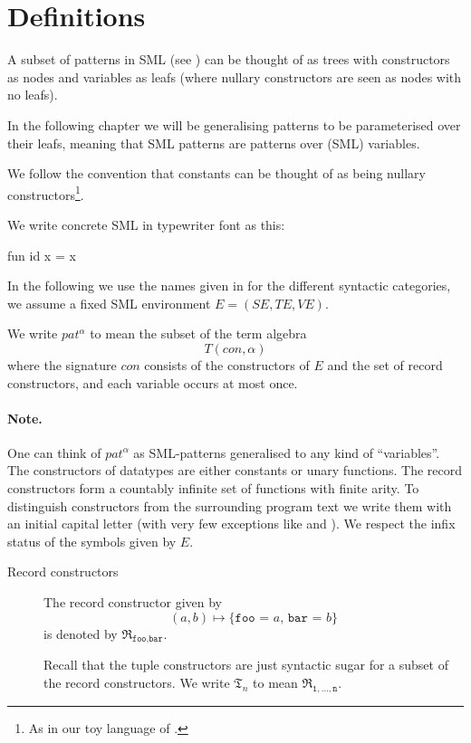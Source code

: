 \section{Definitions}\label{sec:definitions}
A subset of patterns in SML (see ) can be thought of as
trees with constructors as nodes and variables as leafs (where nullary
constructors are seen as nodes with no leafs).

In the following chapter we will be generalising patterns to be parameterised
over their leafs, meaning that SML patterns are patterns over (SML) variables.

We follow the convention that constants can be thought of as being nullary
constructors\footnote{As in our toy language of
  .}.

We write concrete SML in typewriter font as this:
\begin{sml}
fun id x = x
\end{sml}

In the following we use the names given in \cite{SML97} for the different
syntactic categories, we assume a fixed SML environment $E = (S\!E, T\!E,
V\!E)$.

\begin{definition}
  We write $pat^\alpha$ to mean the subset of the term algebra
  \[
  T(con, \alpha)
  \]
  where the signature $con$ consists of the constructors of $E$ and the set of
  record constructors, and each variable occurs at most once.
\end{definition}

\paragraph{Note.} One can think of $pat^\alpha$ as SML-patterns generalised to
any kind of ``variables''. The constructors of datatypes are either constants or
unary functions. The record constructors form a countably infinite set of
functions with finite arity. To distinguish constructors from the surrounding
program text we write them with an initial capital letter (with very few
exceptions like \codeinline{::} and ). We respect the infix
status of the symbols given by $E$.

\begin{description}
\item[Record constructors] The record constructor given by
  \[
  (a, b) \mapsto \texttt{\{foo = $a$, bar = $b$\}}
  \]
  is denoted by $\mathfrak{R}_{\texttt{foo},\texttt{bar}}$.

  Recall that the tuple constructors are just syntactic sugar for a subset of
  the record constructors. We write $\mathfrak{T}_n$ to mean
  $\mathfrak{R}_{\texttt{1},\ldots,\texttt{n}}$.
\end{description}

